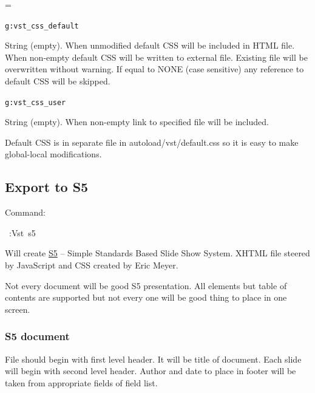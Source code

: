 \documentclass[12pt]{article}
\newenvironment{deflist}[1]{%
\begin{list}{}
{\renewcommand{\makelabel}[1]{\textbf{##1}\hfill}
\settowidth{\labelwidth}{\textbf{#1}}
\leftmargin=\labelwidth
\advance \leftmargin\labelsep}}
{\end{list}}
\begin{document}
\begin{deflist}{iii}

\item[\texttt{g:vst\_css\_default}]

String (empty). When unmodified default CSS will be included in HTML file.
When non-empty default CSS will be written to external file. Existing file
will be overwritten without warning. If equal to NONE (case sensitive) any
reference to default CSS will be skipped.

\item[\texttt{g:vst\_css\_user}]

String (empty). When non-empty link to specified file will be included.
\end{deflist}

Default CSS is in separate file in autoload/vst/default.css so it is easy to
make global-local modifications.

\hypertarget{lexport-to-s5}{}
\subsection{Export to S5}

Command:

\begin{ttfamily}\begin{flushleft}
\mbox{~:Vst~s5}\\
\end{flushleft}\end{ttfamily}

Will create \href{http://meyerweb.com/eric/tools/s5}{S5} -- Simple Standards Based Slide Show System. XHTML file steered
by JavaScript and CSS created by Eric Meyer.

Not every document will be good S5 presentation. All elements but table of
contents are supported but not every one will be good thing to place in one
screen.

\hypertarget{ls5-document}{}
\subsubsection{S5 document}

File should begin with first level header. It will be title of document. Each
slide will begin with second level header. Author and date to place in footer
will be taken from appropriate fields of field list.

\begin{center}
\end{center}
\end{document}
